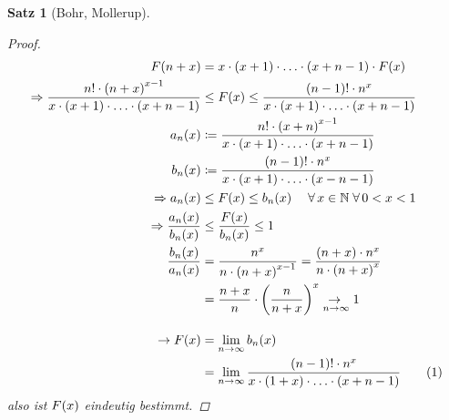 \documentclass[11pt, twoside, a4paper]{article}
\theoremstyle{plain}
\newtheorem{satz}[blockelement]{Satz}
\numberwithin{equation}{subsection}
\newcommand{\numberthis}[0]{\addtocounter{equation}{1}\tag{\theequation}}
\newcommand{\pair}[1]{\left(#1\right)}
\newcommand{\of}[1]{\mathopen{}\mathclose{}\bgroup\left(#1\aftergroup\egroup\right)}
\newcommand{\impl}[0]{\Rightarrow{}}
\newcommand{\fromto}{\rightarrow{}}
\newcommand{\ntoinf}[0]{n\fromto\infty}
\newcommand{\fa}{\;\forall\,}
\newcommand{\N}{\mathbb{N}}
\begin{document}
\begin{satz}[Bohr, Mollerup]
\begin{proof}
\begin{align*}
                F\of{n+x} &= x\cdot\pair{x+1}\cdot\ldots\cdot \pair{x+n-1}\cdot F\of{x}\\
                \impl \frac{n!\cdot\pair{n+x}^{x-1}}{x\cdot \pair{x+1}\cdot\ldots\cdot\pair{x+n-1}} &\leq F\of{x} \leq \frac{\pair{n-1}!\cdot n^x}{x\cdot\pair{x+1}\cdot\ldots\cdot \pair{x+n-1}}\\
                a_n\of{x} &\coloneqq \frac{n!\cdot\pair{x+n}^{x-1}}{x\cdot \pair{x+1}\cdot\ldots\cdot\pair{x+n-1}}\\
                b_n\of{x} &\coloneqq \frac{\pair{n-1}!\cdot n^x}{x\cdot\pair{x+1}\cdot\ldots\cdot \pair{x-n-1}}\\
                \impl a_n\of{x} &\leq F\of{x} \leq b_n\of{x}\quad\fa x\in\N\fa 0 < x < 1\\
                \impl \frac{a_n\of{x}}{b_n\of{x}} &\leq \frac{F\of{x}}{b_n\of{x}} \leq 1\\
                \frac{b_n\of{x}}{a_n\of{x}} &= \frac{n^x}{n\cdot\pair{n+x}^{x-1}} = \frac{\pair{n+x}\cdot n^x}{n\cdot\pair{n+x}^x}\\
                &= \frac{n+x}{n}\cdot\pair{\frac{n}{n+x}}^x\underset{\ntoinf}{\fromto}  1\\[10pt]
                \fromto F\of{x} &= \lim_{\ntoinf} b_n\of{x}\\
                &= \lim_{\ntoinf} \frac{\pair{n-1}! \cdot n^x}{x\cdot\pair{1+x}\cdot \ldots\cdot \pair{x+n-1}}\numberthis\label{eq:gamma-alt}
            \end{align*}
            also ist $F\of{x}$ eindeutig bestimmt.
        \end{proof}
    \end{satz}
\end{document}
